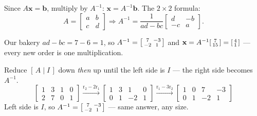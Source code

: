 \documentclass[aspectratio=169, 11pt]{beamer}
\newcommand{\xx}{\mathbf{x}}
\newcommand{\bb}{\mathbf{b}}
\begin{document}
\begin{frame}[t, plain]
  Since $A\xx=\bb$, multiply by $A^{-1}$: \; $\xx=A^{-1}\bb$. \; The $2\times2$ formula:
  \[
    A=\begin{bmatrix} a&b\\c&d \end{bmatrix} \Rightarrow
    A^{-1}=\frac{1}{ad-bc}\begin{bmatrix} d&-b\\-c&a \end{bmatrix}.
  \]
  \begin{block}{Our bakery}
    $ad-bc=7-6=1$, so $A^{-1}=\begin{bsmallmatrix} 7&-3\\-2&1 \end{bsmallmatrix}$ and
    $\xx=A^{-1}\begin{bsmallmatrix} 7\\15 \end{bsmallmatrix}=\begin{bsmallmatrix} 4\\1 \end{bsmallmatrix}$ --- every new order is one multiplication.
  \end{block}
\end{frame}

\begin{frame}[t, plain]
  Reduce $[\,A\mid I\,]$ down \emph{then} up until the left side is $I$ --- the right side becomes $A^{-1}$.
  \[
    \left[\begin{array}{cc|cc} 1&3&1&0 \\ 2&7&0&1 \end{array}\right]
    \xrightarrow{\text{r}_2-2\text{r}_1}
    \left[\begin{array}{cc|cc} 1&3&1&0 \\ 0&1&-2&1 \end{array}\right]
    \xrightarrow{\text{r}_1-3\text{r}_2}
    \left[\begin{array}{cc|cc} 1&0&7&-3 \\ 0&1&-2&1 \end{array}\right]
  \]
  Left side is $I$, so $A^{-1}=\begin{bsmallmatrix} 7&-3\\-2&1 \end{bsmallmatrix}$ --- same answer, any size.
\end{frame}
\end{document}
